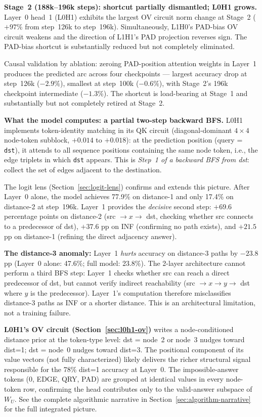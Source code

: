 \documentclass[11pt, a4paper]{article}
\begin{document}
\textbf{Stage~2 (188k--196k steps): shortcut partially dismantled; L0H1 grows.}
Layer~0 head~1 (L0H1) exhibits the largest OV circuit norm change at
Stage~2 ($+97\%$ from step~126k to step~196k). Simultaneously, L1H0's
PAD-bias OV circuit weakens and the direction of L1H1's PAD projection
reverses sign. The PAD-bias shortcut is substantially reduced but not
completely eliminated.

Causal validation by ablation: zeroing PAD-position attention weights in
Layer~1 produces the predicted arc across four checkpoints --- largest
accuracy drop at step~126k ($-2.9\%$), smallest at step~100k ($-0.6\%$),
with Stage~2's 196k checkpoint intermediate ($-1.3\%$). The shortcut is
load-bearing at Stage~1 and substantially but not completely retired at
Stage~2.

\textbf{What the model computes: a partial two-step backward BFS.}
L0H1 implements token-identity matching in its QK circuit (diagonal-dominant
$4 \times 4$ node-token subblock, $+0.014$ to $+0.018$): at the prediction
position (query = \texttt{dst}), it attends to all sequence positions
containing the same node token, i.e., the edge triplets in which \texttt{dst}
appears.  This is \emph{Step~1 of a backward BFS from dst}: collect the set of
edges adjacent to the destination.

The logit lens (Section~\ref{sec:logit-lens}) confirms and extends this
picture.  After Layer~0 alone, the model achieves 77.9\% on distance-1 and
only 17.4\% on distance-2 at step~196k.  Layer~1 provides the \emph{decisive}
second step: $+69.6$ percentage points on distance-2 (src $\to x \to$ dst,
checking whether src connects to a predecessor of dst), $+37.6$ pp on INF
(confirming no path exists), and $+21.5$ pp on distance-1 (refining the
direct adjacency answer).

\textbf{The distance-3 anomaly:} Layer~1 \emph{hurts} accuracy on
distance-3 paths by $-23.8$ pp (Layer~0 alone: 47.6\%; full model: 23.8\%).
The 2-layer architecture cannot perform a third BFS step: Layer~1 checks
whether src can reach a direct predecessor of dst, but cannot verify indirect
reachability (src $\to x \to y \to$ dst where $y$ is the predecessor).
Layer~1's computation therefore misclassifies distance-3 paths as INF or a
shorter distance.  This is an architectural limitation, not a training failure.

\textbf{L0H1's OV circuit (Section~\ref{sec:l0h1-ov})} writes a
node-conditioned distance prior at the token-type level: dst = node~2 or
node~3 nudges toward dist=1; dst = node~0 nudges toward dist=3.  The
positional component of its value vectors (not fully characterized) likely
delivers the richer structural signal responsible for the 78\% dist=1
accuracy at Layer~0.  The impossible-answer tokens (0, EDGE, QRY, PAD) are
grouped at identical values in every node-token row, confirming the head
contributes only to the valid-answer subspace of $W_U$.  See the complete
algorithmic narrative in Section~\ref{sec:algorithm-narrative} for the full
integrated picture.
\end{document}

